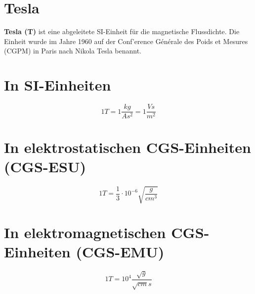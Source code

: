 \documentclass{scrartcl}
\begin{document}
\section*{Tesla}
{\bfseries Tesla (T)} ist eine abgeleitete SI-Einheit für die magnetische Flussdichte. Die Einheit wurde im Jahre 1960 auf der Conf'{e}rence G\'{e}n\'{e}rale des Poids et Mesures (CGPM) in Paris nach Nikola Tesla benannt.\\
\section*{In SI-Einheiten}
\begin{equation}
1T = 1\frac{kg}{As^2}=1\frac{Vs}{m^2} 
\end{equation}
\section*{In elektrostatischen CGS-Einheiten (CGS-ESU)}
\begin{equation}
1T=\frac{1}{3}\cdot10^{-6}\sqrt{\frac{g}{cm^3}}
\end{equation}
\section*{In elektromagnetischen CGS-Einheiten (CGS-EMU)}
\begin{equation}
1T=10^4\frac{\sqrt{g}}{\sqrt{cm}s}
\end{equation}
\end{document}
